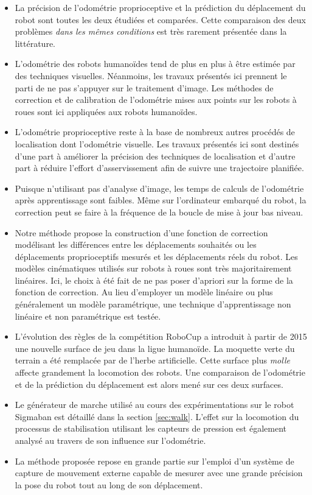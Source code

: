 \begin{itemize}
    \item La précision de l'odométrie proprioceptive et la prédiction du 
        déplacement du robot sont toutes les deux étudiées et comparées.
        Cette comparaison des deux problèmes \textit{dans les mêmes conditions} 
        est très rarement présentée dans la littérature.
    \item L'odométrie des robots humanoïdes tend de plus en plus à être estimée 
        par des techniques visuelles. 
        Néanmoins, les travaux présentés ici prennent le parti de ne pas s'appuyer sur 
        le traitement d'image. 
        Les méthodes de correction et de calibration de l'odométrie
        mises aux points sur les robots à roues sont ici appliquées 
        aux robots humanoïdes.
    \item L'odométrie proprioceptive reste à la base de nombreux autres
        procédés de localisation dont l'odométrie visuelle.
        Les travaux présentés ici sont destinés d'une part à améliorer la précision 
        des techniques de localisation et d'autre part à réduire l'effort d'asservissement 
        afin de suivre une trajectoire planifiée.
    \item Puisque n'utilisant pas d'analyse d'image, les temps de calculs de l'odométrie 
        après apprentissage sont faibles.
        Même sur l'ordinateur embarqué du robot, la correction peut se faire 
        à la fréquence de la boucle de mise à jour bas niveau.
    \item Notre méthode propose la construction d'une fonction de correction
        modélisant les différences entre les déplacements souhaités ou 
        les déplacements proprioceptifs mesurés et les déplacements réels du robot.
        Les modèles cinématiques utilisés sur robots à roues sont très majoritairement linéaires. 
        Ici, le choix à été fait de ne pas poser d'apriori sur la forme de la fonction de correction.
        Au lieu d'employer un modèle linéaire ou plus généralement un modèle paramétrique, 
        une technique d'apprentissage non linéaire et non paramétrique est testée.
    \item L'évolution des règles de la compétition RoboCup a introduit
        à partir de 2015 une nouvelle surface de jeu dans la ligue humanoïde.
        La moquette verte du terrain a été remplacée par de l'herbe artificielle. 
        Cette surface plus \textit{molle} affecte grandement la locomotion des robots. 
        Une comparaison de l'odométrie et de la prédiction du déplacement 
        est alors mené sur ces deux surfaces.
    \item Le générateur de marche utilisé au cours des expérimentations sur le robot
        Sigmaban est détaillé dans la section \ref{sec:walk}. 
        L'effet sur la locomotion du processus de stabilisation 
        utilisant les capteurs de pression est également analysé
        au travers de son influence sur l'odométrie.
    \item La méthode proposée repose en grande partie sur l'emploi d'un
        système de capture de mouvement externe capable de mesurer avec
        une grande précision la pose du robot tout au long de son déplacement.
\end{itemize}


